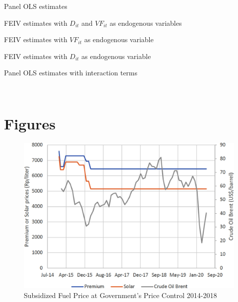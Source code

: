 \documentclass[letterpaper,12pt,leqno]{article}
\begin{document}
\begin{table}[H]
\caption{Panel OLS estimates} 
\scalebox{0.8}{}
\label{t:pols}\end{table}

\begin{table}[H]
\caption{FEIV estimates with $D_{it}$ and $VF_{it}$ as endogenous variables}
\scalebox{0.8}{}    
\label{t:FEIV}
\end{table}

\begin{table}[H]
\caption{FEIV estimates with $VF_{it}$ as endogenous variable}
\scalebox{0.8}{}    
\label{t:FEIV1}
\end{table}

\begin{table}[H]
\caption{FEIV estimates with $D_{it}$ as endogenous variable}
\scalebox{0.8}{}    
\label{t:FEIV2}\end{table}


\begin{table}[H]
\caption{Panel OLS estimates with interaction terms} 
\scalebox{0.8}{}
\label{t:pols2}\end{table}
\\
\pagebreak
\section{Figures}

\begin{figure}[h!]
\includegraphics[scale=0.7]{Final_Project/image/bbm-price-2014-2018.jpg}
\caption{Subsidized Fuel Price at Government's Price Control 2014-2018}
\label{f:1}
\end{figure}
\end{document}
